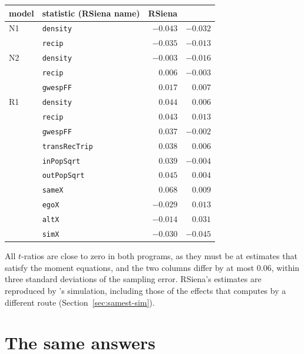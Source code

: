 \begin{center}
\small
\begin{tabular}{llrr}
\toprule
model & statistic (RSiena name) & RSiena & \nwsaom{} \\
\midrule
N1 & \texttt{density} & $-0.043$ & $-0.032$ \\
 & \texttt{recip} & $-0.035$ & $-0.013$ \\
\addlinespace
N2 & \texttt{density} & $-0.003$ & $-0.016$ \\
 & \texttt{recip} & $0.006$ & $-0.003$ \\
 & \texttt{gwespFF} & $0.017$ & $0.007$ \\
\addlinespace
R1 & \texttt{density} & $0.044$ & $0.006$ \\
 & \texttt{recip} & $0.043$ & $0.013$ \\
 & \texttt{gwespFF} & $0.037$ & $-0.002$ \\
 & \texttt{transRecTrip} & $0.038$ & $0.006$ \\
 & \texttt{inPopSqrt} & $0.039$ & $-0.004$ \\
 & \texttt{outPopSqrt} & $0.045$ & $0.004$ \\
 & \texttt{sameX} & $0.068$ & $0.009$ \\
 & \texttt{egoX} & $-0.029$ & $0.013$ \\
 & \texttt{altX} & $-0.014$ & $0.031$ \\
 & \texttt{simX} & $-0.030$ & $-0.045$ \\
\bottomrule
\end{tabular}
\end{center}

All $t$-ratios are close to zero in both programs, as they must be at estimates
that satisfy the moment equations, and the two columns differ by at most 0.06, within
three standard deviations of the sampling error. RSiena's estimates are reproduced
by \nwsaom{}'s simulation, including those of the effects that \nwsaom{} computes
by a different route (Section~\ref{sec:samest-sim}).

\section{The same answers}\label{sec:samest-answers}

